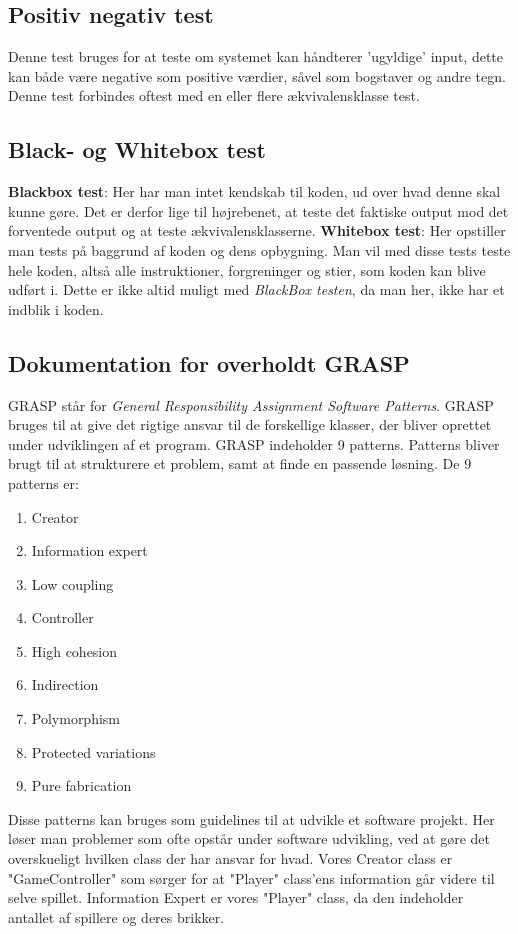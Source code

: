     \subsection{Positiv negativ test}
        Denne test bruges for at teste om systemet kan håndterer 'ugyldige' input, dette kan både være negative som positive værdier, såvel som bogstaver og andre tegn. Denne test forbindes oftest med en eller flere ækvivalensklasse test.
    \subsection{Black- og Whitebox test}

    \textbf{Blackbox test}: Her har man intet kendskab til koden, ud over hvad denne skal kunne gøre. Det er derfor lige til højrebenet, at teste det faktiske output mod det forventede output og at teste ækvivalensklasserne.
    \textbf{Whitebox test}: Her opstiller man tests på baggrund af koden og dens opbygning. Man vil med disse tests teste hele koden, altså alle instruktioner, forgreninger og stier, som koden kan blive udført i. Dette er ikke altid muligt med \textit{BlackBox testen}, da man her, ikke har et indblik i koden.
   
\subsection{Dokumentation for overholdt GRASP}
GRASP står for \textit{General Responsibility Assignment Software Patterns}. 
GRASP bruges til at give det rigtige ansvar til de forskellige klasser, 
der bliver oprettet under udviklingen af et program. GRASP indeholder 9 patterns. 
Patterns bliver brugt til at strukturere et problem, samt at finde en passende løsning. De 9 patterns er:
    \begin{enumerate}
        \item Creator
        \item Information expert
        \item Low coupling
        \item Controller
        \item High cohesion
        \item Indirection
        \item Polymorphism
        \item Protected variations
        \item Pure fabrication
    \end{enumerate}
Disse patterns kan bruges som guidelines til at udvikle et software projekt.
Her løser man problemer som ofte opstår under software udvikling, ved at gøre det overskueligt hvilken
class der har ansvar for hvad. Vores Creator class er "GameController" som sørger for at "Player" class'ens
information går videre til selve spillet. Information Expert er vores "Player" class, 
da den indeholder antallet af spillere
og deres brikker.


